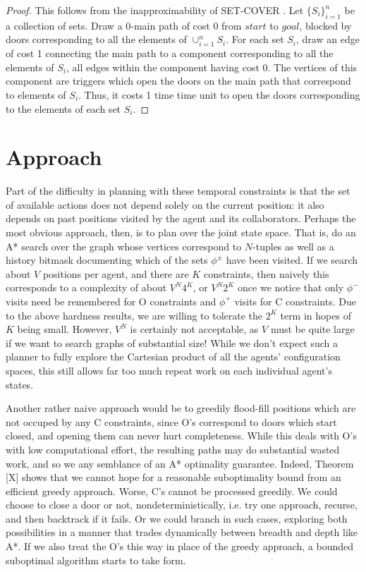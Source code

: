\documentclass[letterpaper]{article}
\begin{document}
\begin{proof}
This follows from the inapproximability of SET-COVER \cite{moshkovitz2012projection}. Let $\{S_i\}_{i=1}^n$ be a collection of sets. Draw a 0-main path of cost 0 from $start$ to $goal$, blocked by doors corresponding to all the elements of $\cup_{i=1}^n S_i$. For each set $S_i$, draw an edge of cost 1 connecting the main path to a component corresponding to all the elements of $S_i$, all edges within the component having cost 0. The vertices of this component are triggers which open the doors on the main path that correspond to elements of $S_i$. Thus, it costs 1 time time unit to open the doors corresponding to the elements of each set $S_i$.
\end{proof}

\section{Approach}

Part of the difficulty in planning with these temporal constraints is that the set of available actions does not depend solely on the current position: it also depends on past positions visited by the agent and its collaborators. Perhaps the most obvious approach, then, is to plan over the joint state space. That is, do an A* search over the graph whose vertices correspond to $N$-tuples as well as a history bitmask documenting which of the sets $\phi^\pm$ have been visited. If we search about $V$ positions per agent, and there are $K$ constraints, then naively this corresponds to a complexity of about $V^N4^K$, or $V^N2^K$ once we notice that only $\phi^-$ visits need be remembered for O constraints and $\phi^+$ visits for C constraints. Due to the above hardness results, we are willing to tolerate the $2^K$ term in hopes of $K$ being small. However, $V^N$ is certainly not acceptable, as $V$ must be quite large if we want to search graphs of substantial size! While we don't expect such a planner to fully explore the Cartesian product of all the agents' configuration spaces, this still allows far too much repeat work on each individual agent's states.

Another rather naive approach would be to greedily flood-fill positions which are not occuped by any C constraints, since O's correspond to doors which start closed, and opening them can never hurt completeness. While this deals with O's with low computational effort, the resulting paths may do substantial wasted work, and so we any semblance of an A* optimality guarantee. Indeed, Theorem [X] shows that we cannot hope for a reasonable suboptimality bound from an efficient greedy approach. Worse, C's cannot be processed greedily. We could choose to close a door or not, nondeterministically, i.e. try one approach, recurse, and then backtrack if it fails. Or we could branch in such cases, exploring both possibilities in a manner that trades dynamically between breadth and depth like A*. If we also treat the O's this way in place of the greedy approach, a bounded suboptimal algorithm starts to take form.
\end{document}
